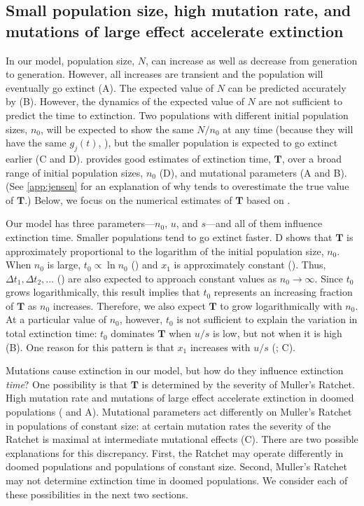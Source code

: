 \documentclass[9pt,lineno]{elife}
\begin{document}
\subsection{Small population size, high mutation rate, and mutations of large effect accelerate extinction}

In our model, population size, $N$, can increase as well as decrease from generation to generation.  However, all increases are transient and the population will eventually go extinct (A).  The expected value of $N$ can be predicted accurately by  (B).  However, the dynamics of the expected value of $N$ are not sufficient to predict the time to extinction.  Two populations with different initial population sizes, $n_0$, will be expected to show the same $N/n_0$ at any time (because they will have the same $g_j(t)$, ), but the smaller population is expected to go extinct earlier (C and D).   provides good estimates of extinction time, $\mathbf{T}$, over a broad range of initial population sizes, $n_0$ (D), and mutational parameters (A and B).  
(See \autoref{app:jensen} for an explanation of why  tends to overestimate the true value of $\mathbf{T}$.)  
Below, we focus on the numerical estimates of $\mathbf{T}$ based on .

Our model has three parameters---$n_0$, $u$, and $s$---and all of them influence extinction time.  Smaller populations tend to go extinct faster.  D shows that $\mathbf{T}$ is approximately proportional to the logarithm of the initial population size, $n_0$.  
%
When $n_0$ is large, $t_0 \propto \ln n_0$ () and $x_1$ is approximately constant ().
Thus, 
$\Delta t_1, \Delta t_2, \ldots$ ()
are also expected to approach constant values as $n_0\to\infty$.  Since
$t_0$ grows logarithmically, this result implies that $t_0$ represents an increasing fraction of $\mathbf{T}$ as $n_0$ increases. 
Therefore, we also expect $\mathbf{T}$ to grow logarithmically with $n_0$.
%
At a particular value of $n_0$, however, $t_0$ is not sufficient to explain the variation in total extinction time: 
$t_0$ dominates $\mathbf{T}$ when $u/s$ is low, but not when it is high (B).  One reason for this pattern is that $x_1$ increases with $u/s$ (; C).


Mutations cause extinction in our model, but how do they influence extinction \textit{time}?  
%
One possibility is that $\mathbf{T}$ is determined by the severity of Muller's Ratchet. High mutation rate and mutations of large effect accelerate extinction in doomed populations ( and A).  Mutational parameters act differently on Muller's Ratchet in populations of constant size: at certain mutation rates the severity of the Ratchet is maximal at intermediate mutational effects \citep{Gabriel_MULLER_1993, Gordo_On_2000, gor00b} (C).
%
There are two possible explanations for this discrepancy.  
%
First, the Ratchet may operate differently in doomed populations and populations of constant size. 
%
Second, Muller's Ratchet may not determine extinction time in doomed populations.  
%
We consider each of these possibilities in the next two sections.  
\end{document}
